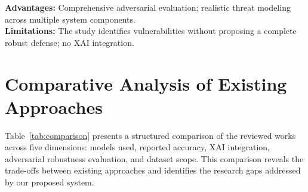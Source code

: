 \textbf{Advantages:} Comprehensive adversarial evaluation; realistic threat modeling across multiple system components.\\
\textbf{Limitations:} The study identifies vulnerabilities without proposing a complete robust defense; no XAI integration.

\section{Comparative Analysis of Existing Approaches}

Table~\ref{tab:comparison} presents a structured comparison of the reviewed works across five dimensions: models used, reported accuracy, XAI integration, adversarial robustness evaluation, and dataset scope. This comparison reveals the trade-offs between existing approaches and identifies the research gaps addressed by our proposed system.

